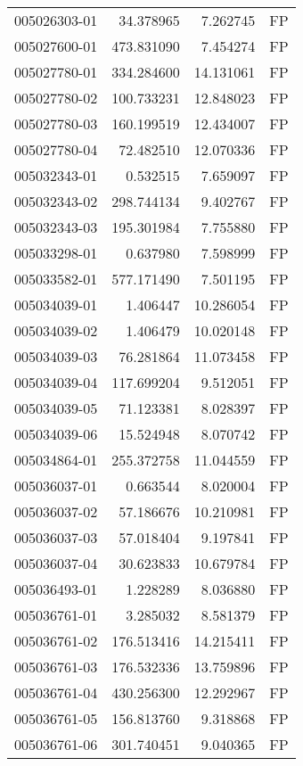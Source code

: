 \begin{tabular}{lrrl}
005026303-01 &   34.378965 &     7.262745 &   FP \\
005027600-01 &  473.831090 &     7.454274 &   FP \\
005027780-01 &  334.284600 &    14.131061 &   FP \\
005027780-02 &  100.733231 &    12.848023 &   FP \\
005027780-03 &  160.199519 &    12.434007 &   FP \\
005027780-04 &   72.482510 &    12.070336 &   FP \\
005032343-01 &    0.532515 &     7.659097 &   FP \\
005032343-02 &  298.744134 &     9.402767 &   FP \\
005032343-03 &  195.301984 &     7.755880 &   FP \\
005033298-01 &    0.637980 &     7.598999 &   FP \\
005033582-01 &  577.171490 &     7.501195 &   FP \\
005034039-01 &    1.406447 &    10.286054 &   FP \\
005034039-02 &    1.406479 &    10.020148 &   FP \\
005034039-03 &   76.281864 &    11.073458 &   FP \\
005034039-04 &  117.699204 &     9.512051 &   FP \\
005034039-05 &   71.123381 &     8.028397 &   FP \\
005034039-06 &   15.524948 &     8.070742 &   FP \\
005034864-01 &  255.372758 &    11.044559 &   FP \\
005036037-01 &    0.663544 &     8.020004 &   FP \\
005036037-02 &   57.186676 &    10.210981 &   FP \\
005036037-03 &   57.018404 &     9.197841 &   FP \\
005036037-04 &   30.623833 &    10.679784 &   FP \\
005036493-01 &    1.228289 &     8.036880 &   FP \\
005036761-01 &    3.285032 &     8.581379 &   FP \\
005036761-02 &  176.513416 &    14.215411 &   FP \\
005036761-03 &  176.532336 &    13.759896 &   FP \\
005036761-04 &  430.256300 &    12.292967 &   FP \\
005036761-05 &  156.813760 &     9.318868 &   FP \\
005036761-06 &  301.740451 &     9.040365 &   FP \\

\end{tabular}
